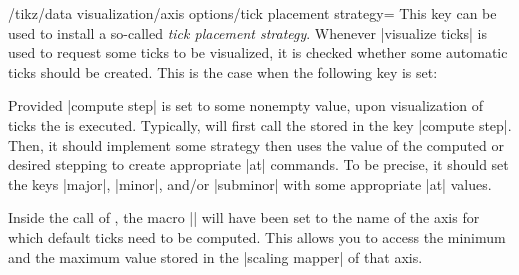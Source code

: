 \begin{key}{/tikz/data visualization/axis options/tick placement strategy=}
  This key can be used to install a so-called \emph{tick placement
    strategy}. Whenever |visualize ticks| is used to request some
  ticks to be visualized, it is checked whether some automatic ticks
  should be created. This is the case when the following key is set:

  Provided |compute step| is set to some nonempty value, upon
  visualization of ticks the  is executed. Typically,
   will first call the  stored in the key
  |compute step|. Then, it should implement some strategy then uses
  the value of the computed or desired stepping to create appropriate
  |at| commands. To be precise, it should set the keys |major|,
  |minor|, and/or |subminor| with some appropriate |at| values.

  Inside the call of , the macro |\tikzdvaxis| will have
  been set to the name of the axis for which default ticks need to be
  computed. This allows you to access the minimum and the maximum
  value stored in the |scaling mapper| of that axis.
  \begin{codeexample}[]
\def\silly{
  \tikzdatavisualizationset{major={at={2,3,5,7,11,13}}}
}
\end{codeexample}
\end{key}


